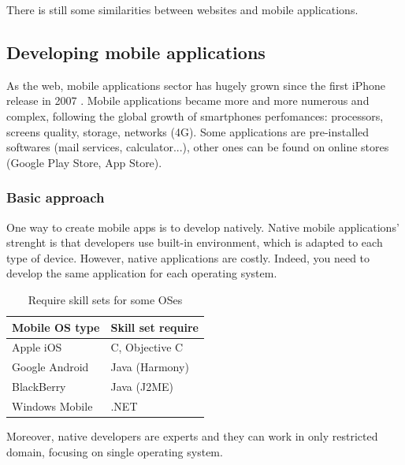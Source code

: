 \documentclass{article}
\begin{document}
                        There is still some similarities between websites and mobile applications.

                \subsection{Developing mobile applications}
                    As the web, mobile applications sector has hugely grown \cite{grown} since the first iPhone release in 2007 \cite{iphone}.
                    Mobile applications became more and more numerous and complex, following the global growth of smartphones perfomances:
                    processors, screens quality, storage, networks (4G). Some applications are pre-installed softwares (mail services, calculator...),
                    other ones can be found on online stores (Google Play Store, App Store).

                    \subsubsection{Basic approach}
                        One way to create mobile apps is to develop natively. Native mobile applications' strenght is that developers use 
                        built-in environment, which is adapted to each type of device. However, native applications are costly. Indeed, you need
                        to develop the same application for each operating system. 
                        \begin{table}[H]
                            \centering
                            \caption{Require skill sets for some OSes}
                            \begin{tabular}{|l|l|}
                                \hline
                                \textbf{Mobile OS type} & \textbf{Skill set require} \\ \hline
                                Apple iOS               & C, Objective C             \\ \hline
                                Google Android          & Java (Harmony)             \\ \hline
                                BlackBerry              & Java (J2ME)                \\ \hline
                                Windows Mobile          & .NET                       \\ \hline
                            \end{tabular}
                        \end{table}
                        Moreover, native developers are experts and they can work in
                        only restricted domain, focusing on single operating system. 
                        
\end{document}
